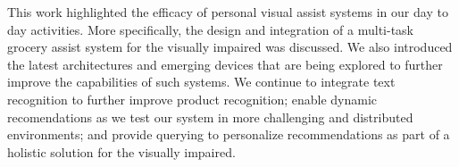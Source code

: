 This work highlighted the efficacy of personal visual assist systems in our day to day activities. 
More specifically, the design and integration of a multi-task grocery assist system for the visually impaired was 
discussed. We also introduced the latest architectures and emerging devices that are being explored to further improve the capabilities of such systems. 
We continue to integrate text recognition to further improve product recognition; enable dynamic recomendations as we test our system in more challenging 
and distributed environments; and provide querying to personalize recommendations as part of a holistic solution for the visually impaired. 
